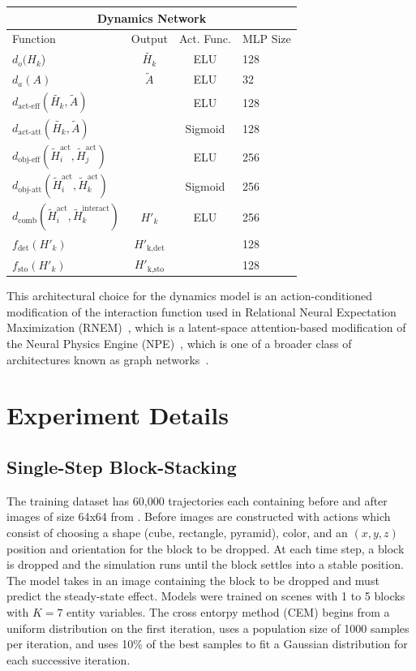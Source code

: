 \begin{center}
\begin{tabular}{lccl}
    \multicolumn{4}{c}{\textbf{Dynamics Network}}\\
    \toprule
    Function  & Output & Act. Func. & MLP Size\\ \midrule
    $d_o(H_k$) & $\tilde{H_k}$ & ELU & 128 \\
    $d_a(A)$ & $\tilde{A}$ & ELU &  32 \\
    $d_{\text{act-eff}}(\tilde{H_k}, \tilde{A})$ &  & ELU & 128 \\
    $d_{\text{act-att}}(\tilde{H_k}, \tilde{A})$ &  & Sigmoid & 128 \\
    $d_{\text{obj-eff}}(\tilde{H}_i^{\text{act}}, \tilde{H}_j^{\text{act}})$ &  & ELU & 256 \\
    $d_{\text{obj-att}}(\tilde{H}_i^{\text{act}}, \tilde{H}_k^{\text{act}})$ &  & Sigmoid & 256 \\
    $d_{\text{comb}}(\tilde{H}_i^{\text{act}}, \tilde{H}_k^{\text{interact}})$ &  $H'_k$& ELU & 256 \\
    $f_{\text{det}}(H'_k)$ &  $H'_{\text{k,det}}$&  & 128 \\
    $f_{\text{sto}}(H'_k)$ &  $H'_{\text{k,sto}}$&  & 128 \\
    \bottomrule
\end{tabular}
\end{center}

This architectural choice for the dynamics model is an action-conditioned modification of the interaction function used in Relational Neural Expectation Maximization (RNEM)~\citep{van2018relational}, which is a latent-space attention-based modification of the Neural Physics Engine (NPE)~\citep{chang2016compositional}, which is one of a broader class of architectures known as graph networks~\citep{battaglia2018relational}.


\section{Experiment Details}

\subsection{Single-Step Block-Stacking}
The training dataset has 60,000 trajectories each containing before and after images of size 64x64 from \cite{janner2018reasoning}. Before images are constructed with actions which consist of choosing a shape (cube, rectangle, pyramid), color, and an $(x, y, z)$ position and orientation for the block to be dropped. At each time step, a block is dropped and the simulation runs until the block settles into a stable position. The model takes in an image containing the block to be dropped and must predict the steady-state effect. Models were trained on scenes with 1 to 5 blocks with $K = 7$ entity variables. The cross entorpy method (CEM) begins from a uniform distribution on the first iteration, uses a population size of 1000 samples per iteration, and uses 10\% of the best samples to fit a Gaussian distribution for each successive iteration.

